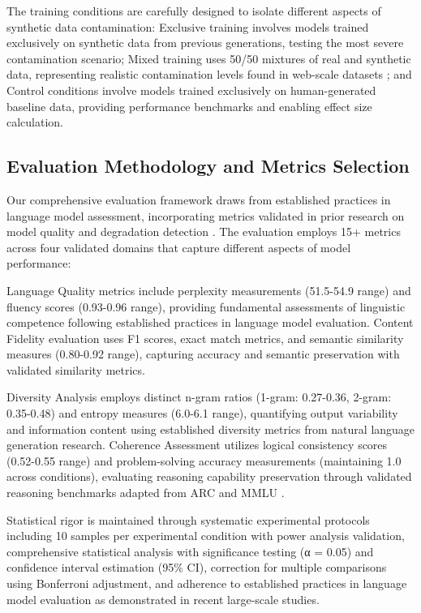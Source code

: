 \documentclass{article}
\begin{document}
The training conditions are carefully designed to isolate different aspects of synthetic data contamination: Exclusive training involves models trained exclusively on synthetic data from previous generations, testing the most severe contamination scenario; Mixed training uses 50/50 mixtures of real and synthetic data, representing realistic contamination levels found in web-scale datasets \cite{gao2020pile}; and Control conditions involve models trained exclusively on human-generated baseline data, providing performance benchmarks and enabling effect size calculation.

\subsection{Evaluation Methodology and Metrics Selection}

Our comprehensive evaluation framework draws from established practices in language model assessment, incorporating metrics validated in prior research on model quality and degradation detection \cite{touvron2023llama, liang2022holistic}. The evaluation employs 15+ metrics across four validated domains that capture different aspects of model performance: 

Language Quality metrics include perplexity measurements (51.5-54.9 range) and fluency scores (0.93-0.96 range), providing fundamental assessments of linguistic competence following established practices in language model evaluation. Content Fidelity evaluation uses F1 scores, exact match metrics, and semantic similarity measures (0.80-0.92 range), capturing accuracy and semantic preservation with validated similarity metrics.

Diversity Analysis employs distinct n-gram ratios (1-gram: 0.27-0.36, 2-gram: 0.35-0.48) and entropy measures (6.0-6.1 range), quantifying output variability and information content using established diversity metrics from natural language generation research. Coherence Assessment utilizes logical consistency scores (0.52-0.55 range) and problem-solving accuracy measurements (maintaining 1.0 across conditions), evaluating reasoning capability preservation through validated reasoning benchmarks adapted from ARC \cite{clark2018think} and MMLU \cite{hendrycks2020measuring}.

Statistical rigor is maintained through systematic experimental protocols including 10 samples per experimental condition with power analysis validation, comprehensive statistical analysis with significance testing (α = 0.05) and confidence interval estimation (95\% CI), correction for multiple comparisons using Bonferroni adjustment, and adherence to established practices in language model evaluation as demonstrated in recent large-scale studies.
\end{document}
